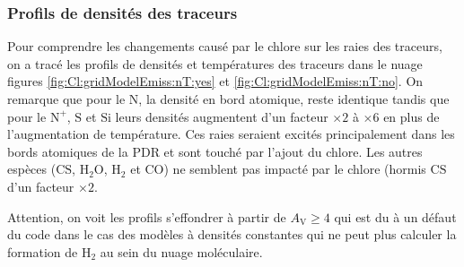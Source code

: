 \subsubsection{Profils de densités des traceurs}

Pour comprendre les changements causé par le chlore sur les raies des traceurs, on a tracé les profils de densités et températures des traceurs dans le nuage figures \ref{fig:Cl:gridModelEmiss:nT:yes} et \ref{fig:Cl:gridModelEmiss:nT:no}. On remarque que pour le $\mathrm{N}$, la densité en bord atomique, reste identique tandis que pour le $\mathrm{N}^+$, $\mathrm{S}$ et $\mathrm{Si}$ leurs densités augmentent d'un facteur $\times 2$ à $\times 6$ en plus de l'augmentation de température. Ces raies seraient excités principalement dans les bords atomiques de la PDR et sont touché par l'ajout du chlore. Les autres espèces ($\mathrm{CS}$, $\mathrm{H}_2\mathrm{O}$, $\mathrm{H}_2$ et $\mathrm{CO}$) ne semblent pas impacté par le chlore (hormis $\mathrm{CS}$ d'un facteur $\times 2$. \newline 

Attention, on voit les profils s'effondrer à partir de $A_\mathrm{V} \geq 4$ qui est du à un défaut du code dans le cas des modèles à densités constantes qui ne peut plus calculer la formation de $\mathrm{H}_2$ au sein du nuage moléculaire. 

